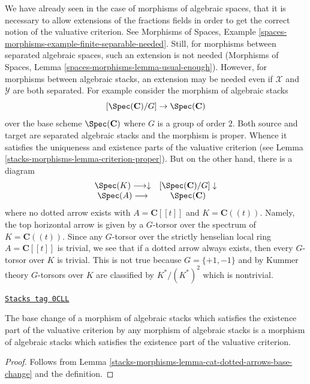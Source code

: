 We have already seen in the case of morphisms of algebraic spaces,
that it is necessary to allow extensions of the fractions fields
in order to get the correct notion of the valuative criterion.
See Morphisms of Spaces, Example
\ref{spaces-morphisms-example-finite-separable-needed}.
Still, for morphisms between separated algebraic spaces, such
an extension is not needed
(Morphisms of Spaces, Lemma \ref{spaces-morphisms-lemma-usual-enough}).
However, for morphisms between algebraic stacks, an extension may
be needed even if $\mathcal{X}$ and $\mathcal{Y}$ are both separated.
For example consider the morphism of algebraic stacks
$$
[\Spec(\mathbf{C})/G] \to \Spec(\mathbf{C})
$$
over the base scheme $\Spec(\mathbf{C})$
where $G$ is a group of order $2$. Both source and target are separated
algebraic stacks and the morphism is proper. Whence it
satisfies the uniqueness and existence parts of the valuative criterion
(see Lemma \ref{stacks-morphisms-lemma-criterion-proper}).
But on the other hand, there is a diagram
$$
\begin{array}{cc}\Spec(K) \longrightarrow\downarrow & [\Spec(\mathbf{C})/G] \downarrow \\ \Spec(A) \longrightarrow & \Spec(\mathbf{C})\end{array}
$$
where no dotted arrow exists with $A = \mathbf{C}[[t]]$ and
$K = \mathbf{C}((t))$. Namely, the top horizontal arrow is given
by a $G$-torsor over the spectrum of $K = \mathbf{C}((t))$. Since any $G$-torsor
over the strictly henselian local ring $A = \mathbf{C}[[t]]$ is trivial, we see
that if a dotted arrow always exists, then every $G$-torsor over
$K$ is trivial. This is not true because $G = \{+1, -1\}$
and by Kummer theory $G$-torsors over $K$ are classified by
$K^*/(K^*)^2$ which is nontrivial.

\begin{lemma}
\label{stacks-morphisms-lemma-base-change-existence}
\href{https://stacks.math.columbia.edu/tag/0CLL}{\texttt{Stacks tag 0CLL}}

The base change of a morphism of algebraic stacks which satisfies the
existence part of the valuative criterion by any morphism of
algebraic stacks is a morphism of algebraic stacks which satisfies the
existence part of the valuative criterion.
\end{lemma}

\begin{proof}
Follows from Lemma \ref{stacks-morphisms-lemma-cat-dotted-arrows-base-change}
and the definition.
\end{proof}

